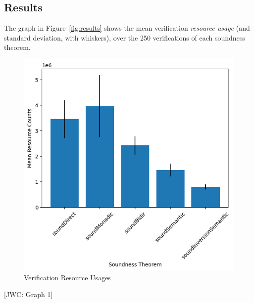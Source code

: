 \documentclass[sigplan,review,screen,anonymous]{acmart}
\newcommand{\comm}[3]{\textcolor{#1}{[#2: #3]}}
\newcommand{\jwc}[1]{\comm{dkgreen}{JWC}{#1}}
\begin{document}
\subsection*{Results}
The graph in Figure~\ref{fig:results} shows the mean verification \emph{resource usage} (and standard deviation, with whiskers), over the 250 verifications of each soundness theorem.


\begin{figure}
  \includegraphics{costgraph.png}
  \caption{Verification Resource Usages}
\end{figure}
\jwc{Graph 1}
\end{document}
